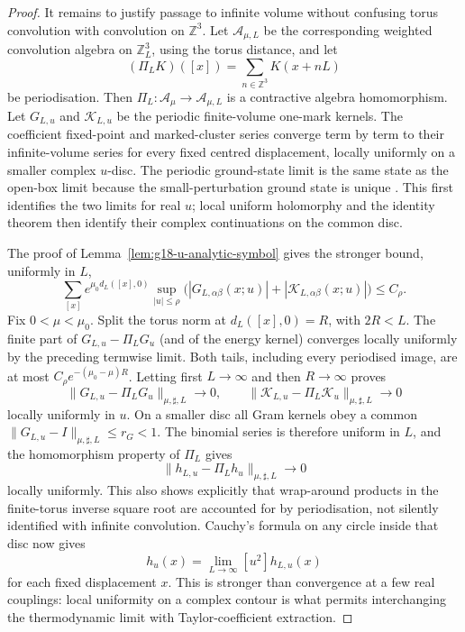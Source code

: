 \begin{proof}
It remains to justify passage to infinite volume without confusing torus
convolution with convolution on $\mathbb Z^3$.  Let $\mathcal A_{\mu,L}$ be
the corresponding weighted convolution algebra on $\mathbb Z_L^3$, using
the torus distance, and let
\[
 (\Pi_LK)([x])=\sum_{n\in\mathbb Z^3}K(x+nL)
\]
be periodisation.  Then $\Pi_L:\mathcal A_\mu\to\mathcal A_{\mu,L}$ is a
contractive algebra homomorphism.  Let $G_{L,u}$ and
$\mathcal K_{L,u}$ be the periodic finite-volume one-mark kernels.  The
coefficient fixed-point and marked-cluster series converge term by term to
their infinite-volume series for every fixed centred displacement, locally
uniformly on a smaller complex $u$-disc.  The periodic ground-state limit is
the same state as the open-box limit because the small-perturbation ground
state is unique \cite{Yarotsky2005Uniqueness}.  This first identifies the
two limits for real $u$; local uniform holomorphy and the identity theorem
then identify their complex continuations on the common disc.

The proof of Lemma~\ref{lem:g18-u-analytic-symbol} gives the stronger bound,
uniformly in $L$,
\[
 \sum_{[x]}e^{\mu_0d_L([x],0)}
 \sup_{|u|\le\rho}
 \bigl(|G_{L,\alpha\beta}(x;u)|
       +|\mathcal K_{L,\alpha\beta}(x;u)|\bigr)\le C_\rho.
\]
Fix $0<\mu<\mu_0$.  Split the torus norm at
$d_L([x],0)=R$, with $2R<L$.  The finite part of
$G_{L,u}-\Pi_LG_u$ (and of the energy kernel) converges locally uniformly by
the preceding termwise limit.  Both tails, including every periodised image,
are at most $C_\rho e^{-(\mu_0-\mu)R}$.  Letting first $L\to\infty$ and then
$R\to\infty$ proves
\[
 \|G_{L,u}-\Pi_LG_u\|_{\mu,\sharp,L}\longrightarrow0,\qquad
 \|\mathcal K_{L,u}-\Pi_L\mathcal K_u\|_{\mu,\sharp,L}
 \longrightarrow0
\]
locally uniformly in $u$.  On a smaller disc all Gram kernels obey a common
$\|G_{L,u}-I\|_{\mu,\sharp,L}\le r_G<1$.  The binomial series is therefore
uniform in $L$, and the homomorphism property of $\Pi_L$ gives
\[
 \|h_{L,u}-\Pi_Lh_u\|_{\mu,\sharp,L}\longrightarrow0
\]
locally uniformly.  This also shows explicitly that wrap-around products in
the finite-torus inverse square root are accounted for by periodisation, not
silently identified with infinite convolution.  Cauchy's formula on any
circle inside that disc now gives
\begin{equation}
 [u^2]h_u(x) =
 \lim_{L\to\infty}[u^2]h_{L,u}(x)
 \label{eq:g18-cauchy-coefficient-limit}
\end{equation}
for each fixed displacement $x$.  This is stronger than convergence at a
few real couplings: local uniformity on a complex contour is what permits
interchanging the thermodynamic limit with Taylor-coefficient extraction.


\end{proof}

